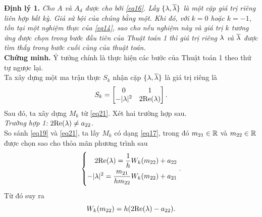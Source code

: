 %
\noindent\textbf{Định lý 1.} \textit{Cho $A$ và $A_d$ được cho bởi \eqref{eq16}. Lấy $\{ \lambda, \overline{\lambda}\}$ là một cặp giá trị riêng liên hợp bất kỳ. Giả sử bội của chúng bằng một. Khi đó, với $k =0$ hoặc $k =-1$, tồn tại một nghiệm thực của \eqref{eq14}, sao cho nếu nghiệm này và giá trị $k$ tương ứng được chọn trong bước đầu tiên của Thuật toán 1 thì giá trị riêng $\lambda$ và $\overline{\lambda}$ được tìm thấy trong bước cuối cùng của thuật toán. }\\
%
\noindent\textbf{Chứng minh.} Ý tưởng chính là thực hiện các bước của Thuật toán 1 theo thứ tự ngược lại.\\
Ta xây dựng một ma trận thực $S_k$ nhận cặp  $\{ \lambda, \overline{\lambda}\}$ là giá trị riêng là
\begin{equation}\label{eq21}
	S_k = \begin{bmatrix}
		0 &1\\
		-\vert \lambda \vert ^2 & 2 \mathrm{Re}(\lambda)
	\end{bmatrix}.
\end{equation}
Sau đó, ta xây dựng $M_k$ từ \eqref{eq21}. Xét hai trường hợp sau.\\
\noindent\textit{Trường hợp 1:} $2\mathrm{Re}(\lambda) \ne a_{22}$.\\
So sánh \eqref{eq19} và \eqref{eq21}, ta lấy $M_k$ có dạng \eqref{eq17}, trong đó $m_{21} \in \mathbb{R}$ và $m_{22} \in \mathbb{R}$ được chọn sao cho thỏa mãn phương trình sau
\begin{equation*}
	\left\{\begin{aligned}2\mathrm{Re}(\lambda) = \dfrac{1}{h } W_k(m_{22}) +a_{22} \\ -\vert \lambda\vert ^2 = \dfrac{m_{21}}{h  m_{22}} W_k(m_{22}) + a_{21}\end{aligned}\right..
\end{equation*}
Từ đó suy ra
\begin{equation}\label{eq22}
	W_k(m_{22}) = h (2\mathrm{Re}(\lambda) - a_{22}).
\end{equation}

